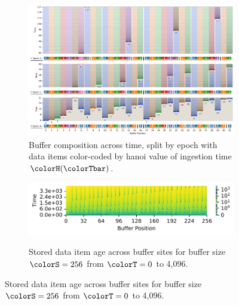 \begin{figure}[htbp!]
\begin{subfigure}[b]{\linewidth}
\includegraphics[width=\linewidth]{
binder/teeplots/41/num-generations=128+surface-size=32+viz=site-reservation-by-rank-spliced-at-heatmap+ext=}
\vspace{-4.5ex}\caption{
  Buffer composition across time, split by epoch with data items color-coded by hanoi value of ingestion time $\colorH(\colorTbar)$.
}
\label{fig:hsurf-stretched-implementation-schematic}
\end{subfigure}

\vspace{0.5ex}
\begin{minipage}[]{\textwidth}
 \vspace{-2pt}
  \begin{subfigure}[t]{0.65\linewidth}
    \vspace{0pt}
    \centering
  \includegraphics[width=0.88\linewidth,clip]{binder/teeplots/41/cnorm=log+num-generations=4096+surface-size=256+viz=site-ingest-depth-by-rank-heatmap+ynorm=linear+ext=}
  \end{subfigure}%
  \begin{subfigure}[t]{0.35\linewidth}
  \vspace{-2pt}
  \caption{%
    \footnotesize
    Stored data item age across buffer sites for buffer size $\colorS=256$ from $\colorT=0$ to 4,096.
  }
  \label{fig:hsurf-stretched-implementation-heatmap}
\end{subfigure}
\end{minipage}


\end{figure}
